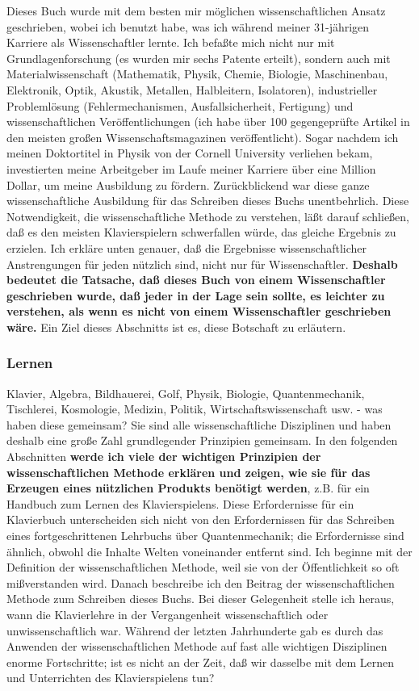 Dieses Buch wurde mit dem besten mir möglichen wissenschaftlichen Ansatz geschrieben, wobei ich benutzt habe, was ich während meiner 31-jährigen Karriere als Wissenschaftler lernte.
Ich befaßte mich nicht nur mit Grundlagenforschung (es wurden mir sechs Patente erteilt), sondern auch mit Materialwissenschaft (Mathematik, Physik, Chemie, Biologie, Maschinenbau, Elektronik, Optik, Akustik, Metallen, Halbleitern, Isolatoren), industrieller Problemlösung (Fehlermechanismen, Ausfallsicherheit, Fertigung) und wissenschaftlichen Veröffentlichungen (ich habe über 100 gegengeprüfte Artikel in den meisten großen Wissenschaftsmagazinen veröffentlicht).
Sogar nachdem ich meinen Doktortitel in Physik von der Cornell University verliehen bekam, investierten meine Arbeitgeber im Laufe meiner Karriere über eine Million Dollar, um meine Ausbildung zu fördern.
Zurückblickend war diese ganze wissenschaftliche Ausbildung für das Schreiben dieses Buchs unentbehrlich.
Diese Notwendigkeit, die wissenschaftliche Methode zu verstehen, läßt darauf schließen, daß es den meisten Klavierspielern schwerfallen würde, das gleiche Ergebnis zu erzielen.
Ich erkläre unten genauer, daß die Ergebnisse wissenschaftlicher Anstrengungen für jeden nützlich sind, nicht nur für Wissenschaftler.
\textbf{Deshalb bedeutet die Tatsache, daß dieses Buch von einem Wissenschaftler geschrieben wurde, daß jeder in der Lage sein sollte, es leichter zu verstehen, als wenn es nicht von einem Wissenschaftler geschrieben wäre.}
Ein Ziel dieses Abschnitts ist es, diese Botschaft zu erläutern.


\subsubsection{Lernen}
\label{c3_2b}

Klavier, Algebra, Bildhauerei, Golf, Physik, Biologie, Quantenmechanik, Tischlerei, Kosmologie, Medizin, Politik, Wirtschaftswissenschaft usw. - was haben diese gemeinsam?
Sie sind alle wissenschaftliche Disziplinen und haben deshalb eine große Zahl grundlegender Prinzipien gemeinsam.
In den folgenden Abschnitten \textbf{werde ich viele der wichtigen Prinzipien der wissenschaftlichen Methode erklären und zeigen, wie sie für das Erzeugen eines nützlichen Produkts benötigt werden}, z.B. für ein Handbuch zum Lernen des Klavierspielens.
Diese Erfordernisse für ein Klavierbuch unterscheiden sich nicht von den Erfordernissen für das Schreiben eines fortgeschrittenen Lehrbuchs über Quantenmechanik; die Erfordernisse sind ähnlich, obwohl die Inhalte Welten voneinander entfernt sind.
Ich beginne mit der Definition der wissenschaftlichen Methode, weil sie von der Öffentlichkeit so oft mißverstanden wird.
Danach beschreibe ich den Beitrag der wissenschaftlichen Methode zum Schreiben dieses Buchs.
Bei dieser Gelegenheit stelle ich heraus, wann die Klavierlehre in der Vergangenheit wissenschaftlich oder unwissenschaftlich war.
Während der letzten Jahrhunderte gab es durch das Anwenden der wissenschaftlichen Methode auf fast alle wichtigen Disziplinen enorme Fortschritte; ist es nicht an der Zeit, daß wir dasselbe mit dem Lernen und Unterrichten des Klavierspielens tun?

